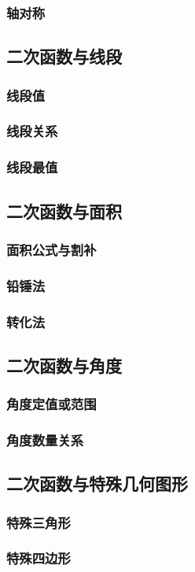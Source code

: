 \subsubsection*{轴对称}
\subsection{二次函数与\textbf{线段}}

\subsubsection*{线段值}

\subsubsection*{线段关系}

\subsubsection*{线段最值}

\subsection{二次函数与\textbf{面积}}

\subsubsection*{面积公式与割补}

\subsubsection*{铅锤法}

\subsubsection*{转化法}

\subsection{二次函数与\textbf{角度}}

\subsubsection*{角度定值或范围}

\subsubsection*{角度数量关系}

\subsection{二次函数与\textbf{特殊几何图形}}

\subsubsection*{特殊三角形}

\subsubsection*{特殊四边形}